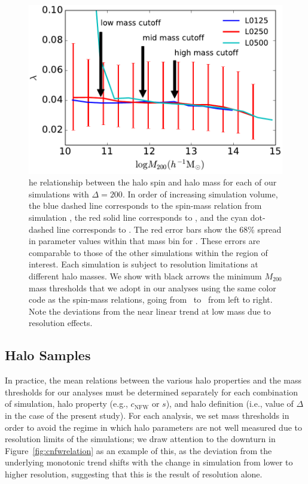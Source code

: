 \documentclass[usenatbib]{mnras}
\begin{document}
\begin{figure}
\centering
\includegraphics[width=.5\textwidth]{masscut_spin_d200.pdf}
\caption{
he relationship between the halo spin and halo mass for each of our simulations with $\Delta =200$. 
In order of increasing simulation volume, the blue dashed line corresponds to the spin-mass relation from simulation 
\simA, the red solid line corresponds to \simB, and the cyan dot-dashed line corresponds to \simC. The red error bars show the 68\% spread in
parameter values within that mass bin for \simB. These errors are comparable to those of the other simulations
within the region of interest.
Each simulation is subject to resolution limitations at different halo masses. We show with black arrows 
the minimum $M_{200}$ mass thresholds that we adopt in our analyses using the same color code as 
the spin-mass relations, going from \simA \ to \simC \ from left to right. Note the deviations from the near linear
trend at low mass due to resolution effects.
}
\label{fig:spinrelation}
\end{figure}

\subsection{Halo Samples}

In practice, the mean relations between the various halo properties and the mass 
thresholds for our analyses must be determined separately for each combination of simulation, 
halo property (e.g., $c_{\mathrm{NFW}}$ or $s$), and halo definition (i.e., value of $\Delta$ in the case of the present study). 
For each analysis, we set mass thresholds in order to avoid the regime in which 
halo parameters are not well measured due to resolution limits of the simulations; 
we draw attention to the downturn in Figure~\ref{fig:cnfwrelation} as an example of this, 
as the deviation from the underlying monotonic trend shifts with the change in 
simulation from lower to higher resolution, suggesting that this is the result of resolution alone. 
\end{document}

